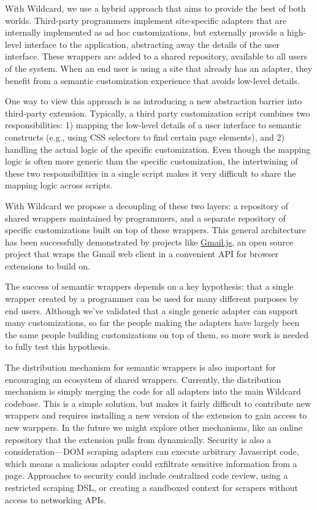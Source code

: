 \documentclass[sigplan,screen,10pt,anonymous,review]{acmart}
\begin{document}
With Wildcard, we use a hybrid approach that aims to provide the best of
both worlds. Third-party programmers implement site-specific adapters
that are internally implemented as ad hoc customizations, but externally
provide a high-level interface to the application, abstracting away the
details of the user interface. These wrappers are added to a shared
repository, available to all users of the system. When an end user is
using a site that already has an adapter, they benefit from a semantic
customization experience that avoids low-level details.

One way to view this approach is as introducing a new abstraction
barrier into third-party extension. Typically, a third party
customization script combines two responsibilities: 1) mapping the
low-level details of a user interface to semantic constructs (e.g.,
using CSS selectors to find certain page elements), and 2) handling the
actual logic of the specific customization. Even though the mapping
logic is often more generic than the specific customization, the
intertwining of these two responsibilities in a single script makes it
very difficult to share the mapping logic across scripts.

With Wildcard we propose a decoupling of these two layers: a repository
of shared wrappers maintained by programmers, and a separate repository
of specific customizations built on top of these wrappers. This general
architecture has been successfully demonstrated by projects like
\href{https://github.com/KartikTalwar/gmail.js/}{Gmail.js}, an open
source project that wraps the Gmail web client in a convenient API for
browser extensions to build on.

The success of semantic wrappers depends on a key hypothesis: that a
single wrapper created by a programmer can be used for many different
purposes by end users. Although we've validated that a single generic
adapter can support many customizations, so far the people making the
adapters have largely been the same people building customizations on
top of them, so more work is needed to fully test this hypothesis.

The distribution mechanism for semantic wrappers is also important for
encouraging an ecosystem of shared wrappers. Currently, the distribution
mechanism is simply merging the code for all adapters into the main
Wildcard codebase. This is a simple solution, but makes it fairly
difficult to contribute new wrappers and requires installing a new
version of the extension to gain access to new warppers. In the future
we might explore other mechanisms, like an online repository that the
extension pulls from dynamically. Security is also a consideration---DOM
scraping adapters can execute arbitrary Javascript code, which means a
malicious adapter could exfiltrate sensitive information from a page.
Approaches to security could include centralized code review, using a
restricted scraping DSL, or creating a sandboxed context for scrapers
without access to networking APIs.
\end{document}
